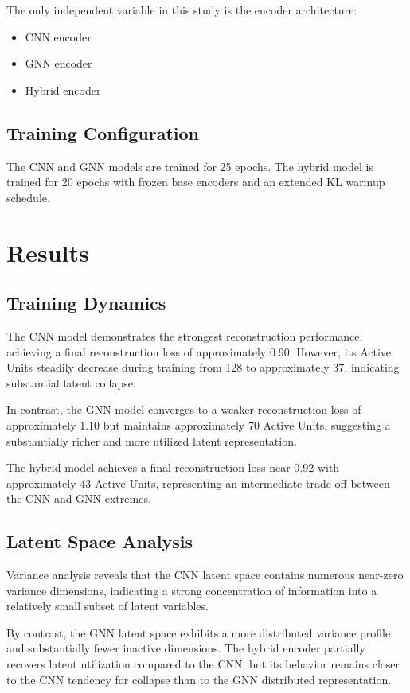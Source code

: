 \documentclass[conference]{IEEEtran}
\begin{document}
The only independent variable in this study is the encoder architecture:

\begin{itemize}
    \item CNN encoder
    \item GNN encoder
    \item Hybrid encoder
\end{itemize}

\subsection{Training Configuration}

The CNN and GNN models are trained for 25 epochs. The hybrid model is trained for 20 epochs with frozen base encoders and an extended KL warmup schedule.

\section{Results}

\subsection{Training Dynamics}

The CNN model demonstrates the strongest reconstruction performance, achieving a final reconstruction loss of approximately 0.90. However, its Active Units steadily decrease during training from 128 to approximately 37, indicating substantial latent collapse.

In contrast, the GNN model converges to a weaker reconstruction loss of approximately 1.10 but maintains approximately 70 Active Units, suggesting a substantially richer and more utilized latent representation.

The hybrid model achieves a final reconstruction loss near 0.92 with approximately 43 Active Units, representing an intermediate trade-off between the CNN and GNN extremes.

\subsection{Latent Space Analysis}

Variance analysis reveals that the CNN latent space contains numerous near-zero variance dimensions, indicating a strong concentration of information into a relatively small subset of latent variables.

By contrast, the GNN latent space exhibits a more distributed variance profile and substantially fewer inactive dimensions. The hybrid encoder partially recovers latent utilization compared to the CNN, but its behavior remains closer to the CNN tendency for collapse than to the GNN distributed representation.
\end{document}

